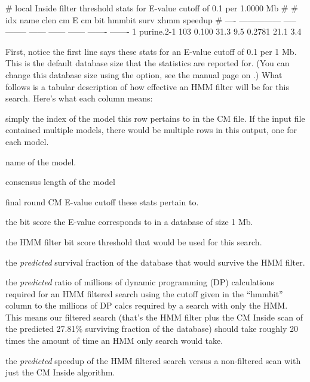 
\begin{sreoutput}
# local Inside filter threshold stats for E-value cutoff of  0.1 per 1.0000 Mb
#
#  idx  name              clen      cm E  cm bit  hmmbit    surv     xhmm  speedup
# ----  ---------------  -----  --------  ------  ------  ------  -------  -------
     1  purine.2-1         103     0.100    31.3     9.5  0.2781     21.1      3.4
\end{sreoutput}

First, notice the first line says these stats for an E-value cutoff of
0.1 per 1 Mb. This is the default database size that the statistics
are reported for. (You can change this database size using the
 option, see the manual page on .) What follows
is a tabular description of how effective an HMM filter will be for
this search. Here's what each column means:

\begin{wideitem}

\item[\emprog{idx}] simply the index of the model this row pertains to in
  the CM file. If the input file  contained
  multiple models, there would be multiple rows in this output, one for
  each model.

\item[\emprog{name}] name of the model.

\item[\emprog{clen}] consensus length of the model

\item[\emprog{cm E}] final round CM E-value cutoff these stats pertain
  to.

\item[\emprog{cm bit}] the bit score the E-value corresponds to in a
  database of size 1 Mb.

\item[\emprog{hmm bit}] the HMM filter bit score threshold that would
  be used for this search.

\item[\emprog{surv}] the \textit{predicted} survival fraction of the database
  that would survive the HMM filter.

\item[\emprog{xhmm}] the \emph{predicted} ratio of millions of dynamic programming (DP)
  calculations required for an HMM filtered search using the cutoff
  given in the ``hmmbit'' column to the millions of DP calcs required
  by a search with only the HMM. This means our filtered search
  (that's the HMM filter plus the CM Inside scan of the predicted
  27.81\% surviving fraction of the database) should take
  roughly 20 times the amount of time an HMM only search would take.
  
\item[\emprog{speedup}] the \textit{predicted} speedup of the HMM filtered
  search versus a non-filtered scan with just the CM Inside algorithm.

\end{wideitem}

